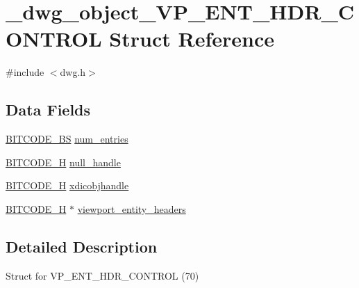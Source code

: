 \hypertarget{struct__dwg__object__VP__ENT__HDR__CONTROL}{\section{\-\_\-dwg\-\_\-object\-\_\-\-V\-P\-\_\-\-E\-N\-T\-\_\-\-H\-D\-R\-\_\-\-C\-O\-N\-T\-R\-O\-L \-Struct \-Reference}
\label{struct__dwg__object__VP__ENT__HDR__CONTROL}
}


{\ttfamily \#include $<$dwg.\-h$>$}

\subsection*{\-Data \-Fields}
\begin{DoxyCompactItemize}
\item 
\hyperlink{dwg_8h_a94297606fbd4a4ff97e8add284af0809}{\-B\-I\-T\-C\-O\-D\-E\-\_\-\-B\-S} \hyperlink{struct__dwg__object__VP__ENT__HDR__CONTROL_ab065c9a26f1c443c0736fafe4d6903b8}{num\-\_\-entries}
\item 
\hyperlink{dwg_8h_a7c700e94e047a97ba8c24bdfe4029dc3}{\-B\-I\-T\-C\-O\-D\-E\-\_\-\-H} \hyperlink{struct__dwg__object__VP__ENT__HDR__CONTROL_a603fd55a4790599ed3f1952347d9e567}{null\-\_\-handle}
\item 
\hyperlink{dwg_8h_a7c700e94e047a97ba8c24bdfe4029dc3}{\-B\-I\-T\-C\-O\-D\-E\-\_\-\-H} \hyperlink{struct__dwg__object__VP__ENT__HDR__CONTROL_a44c9aac77d9825725ac4aabaeeaeb0e6}{xdicobjhandle}
\item 
\hyperlink{dwg_8h_a7c700e94e047a97ba8c24bdfe4029dc3}{\-B\-I\-T\-C\-O\-D\-E\-\_\-\-H} $\ast$ \hyperlink{struct__dwg__object__VP__ENT__HDR__CONTROL_a6b5de6a1759e9fb88004449b991f408c}{viewport\-\_\-entity\-\_\-headers}
\end{DoxyCompactItemize}


\subsection{\-Detailed \-Description}
\-Struct for \-V\-P\-\_\-\-E\-N\-T\-\_\-\-H\-D\-R\-\_\-\-C\-O\-N\-T\-R\-O\-L (70) 

